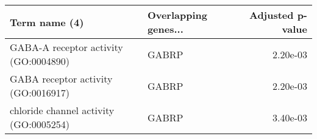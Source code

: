 \begin{tabular}{llr}
\toprule
                         Term name (4) & Overlapping genes... &  Adjusted p-value \\
\midrule
 GABA-A receptor activity (GO:0004890) &                GABRP &          2.20e-03 \\
   GABA receptor activity (GO:0016917) &                GABRP &          2.20e-03 \\
chloride channel activity (GO:0005254) &                GABRP &          3.40e-03 \\
\bottomrule
\end{tabular}
